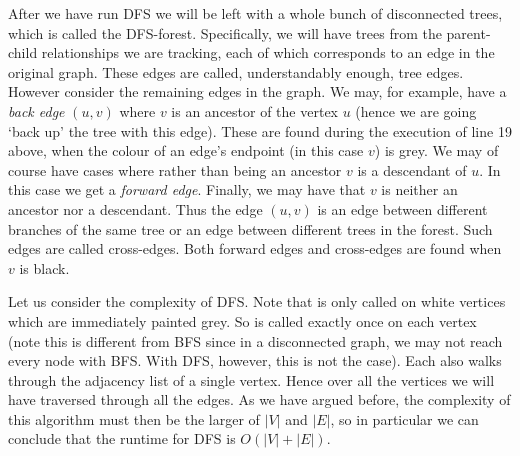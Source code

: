 After we have run DFS we will be left with a whole bunch of disconnected trees, which is called the DFS-forest. Specifically, we will have trees from the parent-child relationships we are tracking, each of which corresponds to an edge in the original graph. These edges are called, understandably enough, tree edges. However consider the remaining edges in the graph. We may, for example, have a \textit{back edge} $(u, v) $ where $v$ is an ancestor of the vertex $u$ (hence we are going `back up' the tree with this edge). These are found during the execution of line 19 above, when the colour of an edge's endpoint (in this case $v$) is grey. We may of course have cases where rather than being an ancestor $v$ is a descendant of $u$. In this case we get a \textit{forward edge}. Finally, we may have that $v$ is neither an ancestor nor a descendant. Thus the edge $(u, v)$ is an edge between different branches of the same tree or an edge between different trees in the forest. Such edges are called cross-edges. Both forward edges and cross-edges are found when $v$ is black.


Let us consider the complexity of DFS. Note that  is only called on white vertices which are immediately painted grey. So  is called exactly once on each vertex (note this is different from BFS since in a disconnected graph, we may not reach every node with BFS. With DFS, however, this is not the case). Each  also walks through the adjacency list of a single vertex. Hence over all the vertices we will have traversed through all the edges. As we have argued before, the complexity of this algorithm must then be the larger of $\left| V \right|$ and $\left| E \right|$, so in particular we can conclude that the runtime for DFS is $O(\left| V \right| + \left| E \right|)$.
